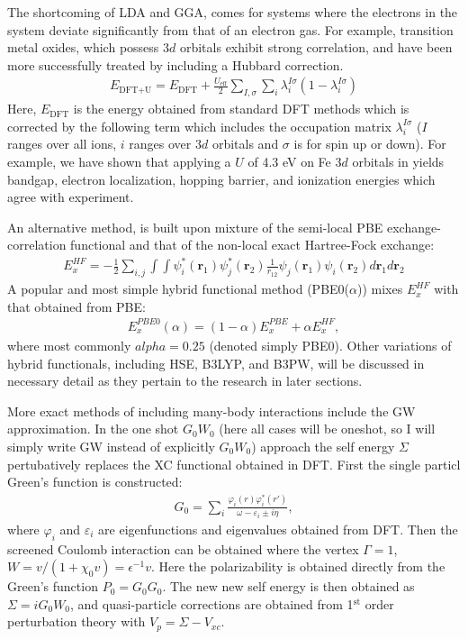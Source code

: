 The shortcoming of LDA and GGA, comes for systems where the electrons in the system deviate significantly from that of an electron gas. For example, transition metal oxides, which possess $3d$ orbitals exhibit strong correlation, and have been more successfully treated by including a Hubbard correction.~\cite{dudarev1998electron}
\begin{align}
    E_{\text{DFT}+\text{U}}=E_{\text{DFT}}+\frac{U_{\text{eff}}}{2}\sum_{I,\sigma}\sum_{i}\lambda_{i}^{I\sigma}(1-\lambda_{i}^{I\sigma})
    \label{intro:eq:U}
\end{align}
Here, $E_\text{DFT}$ is the energy obtained from standard DFT methods which is corrected by the following term which includes the occupation matrix $\lambda_i^{I\sigma}$ ($I$ ranges over all ions, $i$ ranges over $3d$ orbitals and $\sigma$ is for spin up or down). For example, we have shown that applying a $U$ of 4.3 eV on Fe $3d$ orbitals in  yields bandgap, electron localization, hopping barrier, and ionization energies which agree with experiment.~\cite{smart2017effect}

An alternative method, is built upon mixture of the semi-local PBE exchange-correlation functional and that of the non-local exact Hartree-Fock exchange:
\begin{align}
    E_x^{HF} = -\frac{1}{2} \sum_{i,j} \int\int \psi_i^*(\textbf{r}_1)\psi_j^*(\textbf{r}_2) \frac{1}{r_{12}} \psi_j(\textbf{r}_1)\psi_i(\textbf{r}_2) d\textbf{r}_1 d\textbf{r}_2
    \label{intro:eq:HF}
\end{align}
A popular and most simple hybrid functional method (PBE0($\alpha$)) mixes $E_x^{HF}$ with that obtained from PBE:
\begin{align}
    E_{x}^{PBE0}(\alpha) = (1-\alpha) E_x^{PBE} + \alpha E_x^{HF},
    \label{intro:eq:PBE0a}
\end{align}
where most commonly $alpha=0.25$ (denoted simply PBE0). Other variations of hybrid functionals, including HSE, B3LYP, and B3PW, will be discussed in necessary detail as they pertain to the research in later sections.


More exact methods of including many-body interactions include the GW approximation. In the one shot $G_0W_0$ (here all cases will be oneshot, so I will simply write GW instead of explicitly $G_0W_0$) approach the self energy $\Sigma$ pertubatively replaces the XC functional obtained in DFT. First the single particl Green's function is constructed:
\begin{align}
    G_0 = \sum_i \frac{\varphi_i(r)\varphi_i^*(r')}{\omega-\varepsilon_i \pm i\eta },
    \label{intro:eq:g0}
\end{align}
where $\varphi_i$ and $\varepsilon_i$ are eigenfunctions and eigenvalues obtained from DFT. Then the screened Coulomb interaction can be obtained where the vertex $\Gamma = 1$, $W = v/(1+\chi_0 v) = \epsilon^{-1} v$. Here the polarizability is obtained directly from the Green's function $P_0=G_0G_0$. The new new self energy is then obtained as $\Sigma = iG_0W_0$, and quasi-particle corrections are obtained from 1$^\text{st}$ order perturbation theory with $V_p = \Sigma - V_{xc}$.



